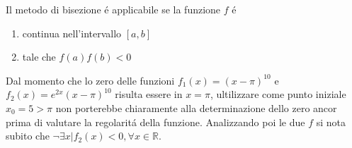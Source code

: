 Il metodo di bisezione \'e applicabile se la funzione \(f\) \'e
\begin{enumerate}

\item continua nell'intervallo \( [a,b] \)
\item tale che \( f(a)f(b)<0 \)

\end{enumerate}

Dal momento che lo zero delle funzioni \( f_1(x)=(x-\pi)^{10} \) e \( f_2(x)=e^{2x}(x-\pi)^{10} \) risulta essere in \( x=\pi \), ultilizzare come punto iniziale \( x_0 = 5 > \pi \) non porterebbe chiaramente alla determinazione dello zero ancor prima di valutare la regolarit\'a della funzione. 
Analizzando poi le due \( f \) si nota subito che \( 
\neg \exists x | f_2(x)<0, \forall x \in \mathbb{R} 
\).

 

